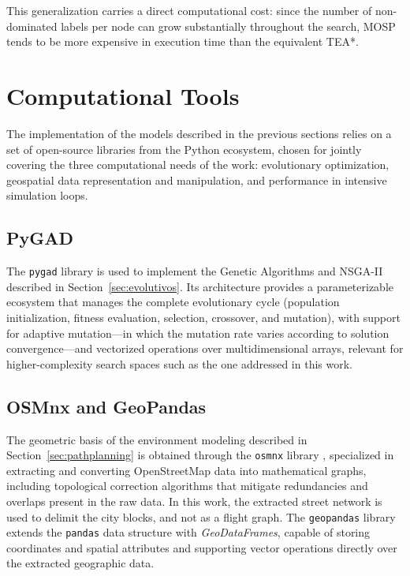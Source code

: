 This generalization carries a direct computational cost: since the number of non-dominated labels per node can grow substantially throughout the search, MOSP tends to be more expensive in execution time than the equivalent TEA*.

\section{Computational Tools}\label{sec:ferramentas}

The implementation of the models described in the previous sections relies on a set of open-source libraries from the Python ecosystem, chosen for jointly covering the three computational needs of the work: evolutionary optimization, geospatial data representation and manipulation, and performance in intensive simulation loops.

\subsection{PyGAD}

The \texttt{pygad} library \cite{Gad2021} is used to implement the Genetic Algorithms and NSGA-II described in Section~\ref{sec:evolutivos}. Its architecture provides a parameterizable ecosystem that manages the complete evolutionary cycle (population initialization, fitness evaluation, selection, crossover, and mutation), with support for adaptive mutation—in which the mutation rate varies according to solution convergence—and vectorized operations over multidimensional arrays, relevant for higher-complexity search spaces such as the one addressed in this work.

\subsection{OSMnx and GeoPandas}

The geometric basis of the environment modeling described in Section~\ref{sec:pathplanning} is obtained through the \texttt{osmnx} library \cite{Boeing2017}, specialized in extracting and converting OpenStreetMap data into mathematical graphs, including topological correction algorithms that mitigate redundancies and overlaps present in the raw data. In this work, the extracted street network is used to delimit the city blocks, and not as a flight graph. The \texttt{geopandas} library \cite{Jordahl2020} extends the \texttt{pandas} data structure with \textit{GeoDataFrames}, capable of storing coordinates and spatial attributes and supporting vector operations directly over the extracted geographic data.


